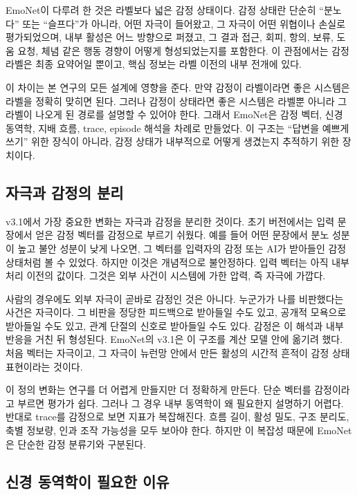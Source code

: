 \documentclass[11pt,a4paper]{article}
\begin{document}
EmoNet이 다루려 한 것은 라벨보다 넓은 감정 상태이다. 감정 상태란 단순히 ``분노다'' 또는 ``슬프다''가 아니라, 어떤 자극이 들어왔고, 그 자극이 어떤 위협이나 손실로 평가되었으며, 내부 활성은 어느 방향으로 퍼졌고, 그 결과 접근, 회피, 항의, 보류, 도움 요청, 체념 같은 행동 경향이 어떻게 형성되었는지를 포함한다. 이 관점에서는 감정 라벨은 최종 요약어일 뿐이고, 핵심 정보는 라벨 이전의 내부 전개에 있다.

이 차이는 본 연구의 모든 설계에 영향을 준다. 만약 감정이 라벨이라면 좋은 시스템은 라벨을 정확히 맞히면 된다. 그러나 감정이 상태라면 좋은 시스템은 라벨뿐 아니라 그 라벨이 나오게 된 경로를 설명할 수 있어야 한다. 그래서 EmoNet은 감정 벡터, 신경 동역학, 지배 흐름, trace, episode 해석을 차례로 만들었다. 이 구조는 ``답변을 예쁘게 쓰기'' 위한 장식이 아니라, 감정 상태가 내부적으로 어떻게 생겼는지 추적하기 위한 장치이다.

\subsection{자극과 감정의 분리}

v3.1에서 가장 중요한 변화는 자극과 감정을 분리한 것이다. 초기 버전에서는 입력 문장에서 얻은 감정 벡터를 감정으로 부르기 쉬웠다. 예를 들어 어떤 문장에서 분노 성분이 높고 불안 성분이 낮게 나오면, 그 벡터를 입력자의 감정 또는 AI가 받아들인 감정 상태처럼 볼 수 있었다. 하지만 이것은 개념적으로 불안정하다. 입력 벡터는 아직 내부 처리 이전의 값이다. 그것은 외부 사건이 시스템에 가한 압력, 즉 자극에 가깝다.

사람의 경우에도 외부 자극이 곧바로 감정인 것은 아니다. 누군가가 나를 비판했다는 사건은 자극이다. 그 비판을 정당한 피드백으로 받아들일 수도 있고, 공개적 모욕으로 받아들일 수도 있고, 관계 단절의 신호로 받아들일 수도 있다. 감정은 이 해석과 내부 반응을 거친 뒤 형성된다. EmoNet의 v3.1은 이 구조를 계산 모델 안에 옮기려 했다. 처음 벡터는 자극이고, 그 자극이 뉴런망 안에서 만든 활성의 시간적 흔적이 감정 상태 표현이라는 것이다.

이 정의 변화는 연구를 더 어렵게 만들지만 더 정확하게 만든다. 단순 벡터를 감정이라고 부르면 평가가 쉽다. 그러나 그 경우 내부 동역학이 왜 필요한지 설명하기 어렵다. 반대로 trace를 감정으로 보면 지표가 복잡해진다. 흐름 길이, 활성 밀도, 구조 분리도, 축별 정보량, 인과 조작 가능성을 모두 보아야 한다. 하지만 이 복잡성 때문에 EmoNet은 단순한 감정 분류기와 구분된다.

\subsection{신경 동역학이 필요한 이유}
\end{document}
